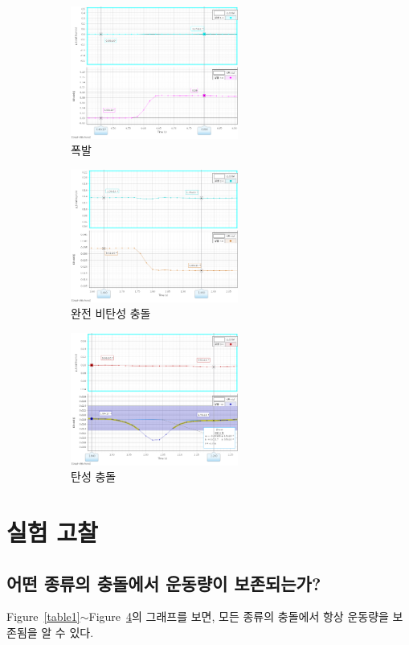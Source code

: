 \documentclass[12pt,a4paper]{article}
\begin{document}
\begin{figure}[!h]
    \centering
    \begin{subfigure}[]{0.3\textwidth}
        \includegraphics[height=4.36cm]{W10_exp.png}
        \caption{\label{fig4-A}폭발}
    \end{subfigure}
    \begin{subfigure}[]{0.3\textwidth}
        \includegraphics[height=4.36cm]{W10_tnelastic.png}
        \caption{\label{fig4-B}완전 비탄성 충돌}
    \end{subfigure}
    \begin{subfigure}[]{0.3\textwidth}
        \includegraphics[height=4.36cm]{W10_elastic.png}
        \caption{\label{fig4-C}탄성 충돌}
    \end{subfigure}
    \caption{\label{fig4}}
\end{figure}
\clearpage
\section{실험 고찰}
\subsection{어떤 종류의 충돌에서 운동량이 보존되는가?}
Figure~\ref{table1}$\sim$Figure~\ref{fig4}의 그래프를 보면, 모든 종류의 충돌에서
항상 운동량을 보존됨을 알 수 있다.
\end{document}
